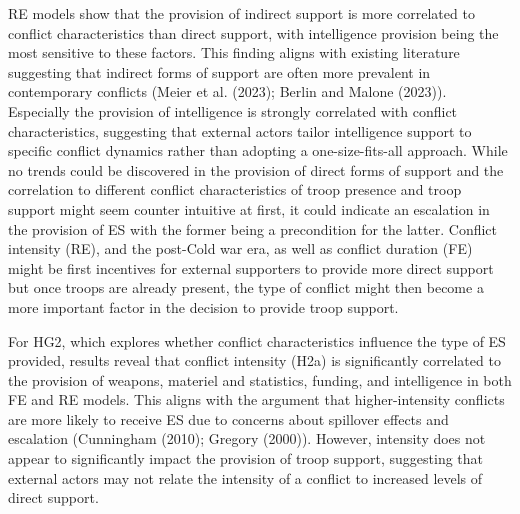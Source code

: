 \documentclass[
]{article}
\begin{document}
RE models show that the provision of indirect support is more correlated
to conflict characteristics than direct support, with intelligence
provision being the most sensitive to these factors. This finding aligns
with existing literature suggesting that indirect forms of support are
often more prevalent in contemporary conflicts (Meier et al. (2023);
Berlin and Malone (2023)). Especially the provision of intelligence is
strongly correlated with conflict characteristics, suggesting that
external actors tailor intelligence support to specific conflict
dynamics rather than adopting a one-size-fits-all approach. While no
trends could be discovered in the provision of direct forms of support
and the correlation to different conflict characteristics of troop
presence and troop support might seem counter intuitive at first, it
could indicate an escalation in the provision of ES with the former
being a precondition for the latter. Conflict intensity (RE), and the
post-Cold war era, as well as conflict duration (FE) might be first
incentives for external supporters to provide more direct support but
once troops are already present, the type of conflict might then become
a more important factor in the decision to provide troop support.

For HG2, which explores whether conflict characteristics influence the
type of ES provided, results reveal that conflict intensity (H2a) is
significantly correlated to the provision of weapons, materiel and
statistics, funding, and intelligence in both FE and RE models. This
aligns with the argument that higher-intensity conflicts are more likely
to receive ES due to concerns about spillover effects and escalation
(Cunningham (2010); Gregory (2000)). However, intensity does not appear
to significantly impact the provision of troop support, suggesting that
external actors may not relate the intensity of a conflict to increased
levels of direct support.
\end{document}

